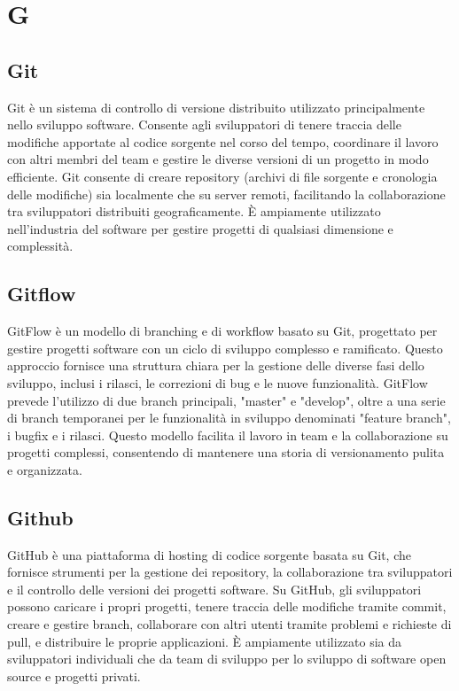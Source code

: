 \section{G}
\subsection{Git}
Git è un sistema di controllo di versione distribuito utilizzato principalmente
nello sviluppo software. Consente agli sviluppatori di tenere traccia delle
modifiche apportate al codice sorgente nel corso del tempo, coordinare il
lavoro con altri membri del team e gestire le diverse versioni di un progetto
in modo efficiente. Git consente di creare repository (archivi di file sorgente
e cronologia delle modifiche) sia localmente che su server remoti, facilitando
la collaborazione tra sviluppatori distribuiti geograficamente. È ampiamente
utilizzato nell'industria del software per gestire progetti di qualsiasi
dimensione e complessità.
\subsection{Gitflow}
GitFlow è un modello di branching e di workflow basato su Git, progettato per
gestire progetti software con un ciclo di sviluppo complesso e ramificato.
Questo approccio fornisce una struttura chiara per la gestione delle diverse
fasi dello sviluppo, inclusi i rilasci, le correzioni di bug e le nuove
funzionalità. GitFlow prevede l'utilizzo di due branch principali, "master" e
"develop", oltre a una serie di branch temporanei per le funzionalità in
sviluppo denominati "feature branch", i bugfix e i rilasci. Questo modello
facilita il lavoro in team e la collaborazione su progetti complessi,
consentendo di mantenere una storia di versionamento pulita e organizzata.
\subsection{Github}
GitHub è una piattaforma di hosting di codice sorgente basata su Git, che
fornisce strumenti per la gestione dei repository, la collaborazione tra
sviluppatori e il controllo delle versioni dei progetti software. Su GitHub,
gli sviluppatori possono caricare i propri progetti, tenere traccia delle
modifiche tramite commit, creare e gestire branch, collaborare con altri utenti
tramite problemi e richieste di pull, e distribuire le proprie applicazioni. È
ampiamente utilizzato sia da sviluppatori individuali che da team di sviluppo
per lo sviluppo di software open source e progetti privati.
